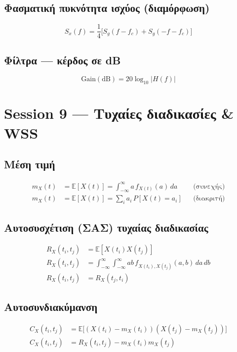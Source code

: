 \documentclass[11pt,a4paper]{article}
\newcommand{\E}{\mathbb{E}}
\begin{document}
\subsection{Φασματική πυκνότητα ισχύος (διαμόρφωση)}
\begin{equation}
S_x(f) = \frac{1}{4}\bigl[S_g(f-f_c) + S_g(-f-f_c)\bigr]
\end{equation}

\subsection{Φίλτρα — κέρδος σε dB}
\begin{equation}
\mathrm{Gain(dB)} = 20\log_{10}|H(f)|
\end{equation}

\section{Session 9 — Τυχαίες διαδικασίες \& WSS}

\subsection{Μέση τιμή}
\begin{align}
m_X(t) &= \E[X(t)] = \int_{-\infty}^{\infty} a\,f_{X(t)}(a)\,da && \text{(συνεχής)} \\
m_X(t) &= \E[X(t)] = \sum_i a_i\,P[X(t)=a_i] && \text{(διακριτή)}
\end{align}

\subsection{Αυτοσυσχέτιση (ΣΑΣ) τυχαίας διαδικασίας}
\begin{align}
R_X(t_i,t_j) &= \E[X(t_i)X(t_j)] \\
R_X(t_i,t_j) &= \int_{-\infty}^{\infty}\!\!\int_{-\infty}^{\infty} ab\,f_{X(t_i),X(t_j)}(a,b)\,da\,db \\
R_X(t_i,t_j) &= R_X(t_j,t_i)
\end{align}

\subsection{Αυτοσυνδιακύμανση}
\begin{align}
C_X(t_i,t_j) &= \E\bigl[(X(t_i)-m_X(t_i))(X(t_j)-m_X(t_j))\bigr] \\
C_X(t_i,t_j) &= R_X(t_i,t_j) - m_X(t_i)m_X(t_j)
\end{align}
\end{document}
